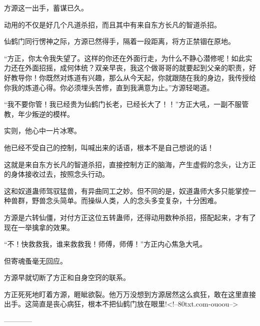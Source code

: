 \begin{this_body}
方源这一出手，蓄谋已久。

动用的不仅是好几个凡道杀招，而且其中有来自东方长凡的智道杀招。

仙鹤门同行愣神之际，方源已然得手，隔着一段距离，将方正禁锢在原地。

“方正，你太令我失望了。这样的你还在外面行走，为什么不静心潜修呢！如此实力还在外面招摇，成何体统？双亲早丧，我这个做哥哥的就要起到父亲的职责，好好教导你！你既然对炼道有兴趣，那么从今天起，你就跟随在我的身边，我传授给你我的炼道心得。你必须埋头苦修，直到我满意为止。”方源轻喝道。

“我不要你管！我已经贵为仙鹤门长老，已经长大了！！”方正大吼，一副不服管教，年少叛逆的模样。

实则，他心中一片冰寒。

他已经不受自己的控制，叫喊出来的话语，根本不是自己想说的话！

这就是来自东方长凡的智道杀招，直接控制方正的脑海，产生虚假的念头，让方正的身体接收过去，按照念头行动。

这和奴道蛊师驾驭猛兽，有异曲同工之妙。但不同的是，奴道蛊师大多只能掌控一种兽群，野兽念头简单。而操纵人类，人的念头多变复杂，十分困难。

方源是六转仙僵，对付方正这位五转蛊师，还得动用数种杀招，搭配起来，才有了现在一举擒拿的效果。

“不！快救救我，谁来救救我！师傅，师傅！”方正内心焦急大吼。

但寄魂蚤毫无回应。

方源早就切断了方正和自身空窍的联系。

方正死死地盯着方源，睚眦欲裂。他万万没想到方源居然这么疯狂，敢在这里直接出手。这简直是丧心病狂，根本不把仙鹤门放在眼里!<!--80txt.com-ouoou-->

------------

\end{this_body}

